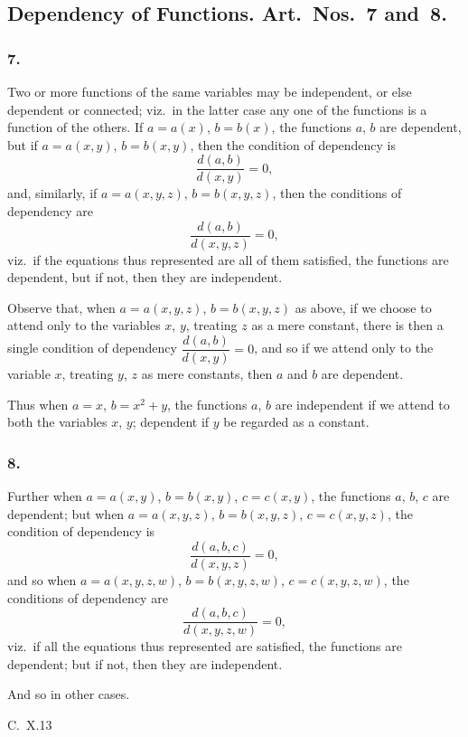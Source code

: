\documentclass[12pt,a4paper]{article}
\theoremstyle{plain}
\begin{document}
\subsection*{Dependency of Functions. Art.~Nos.~7 and~8.}

\subsubsection*{7.}

Two or more functions of the same variables may be independent, or else dependent or connected; viz.~in the latter case any one of the functions is a function of the others. If $a = a(x)$, $b = b(x)$, the functions $a$, $b$ are dependent, but if $a = a(x, y)$, $b = b(x, y)$, then the condition of dependency is
\[
\frac{d(a, b)}{d(x, y)} = 0,
\]
and, similarly, if $a = a(x, y, z)$, $b = b(x, y, z)$, then the conditions of dependency are
\[
\frac{d(a, b)}{d(x, y, z)} = 0,
\]
viz.~if the equations thus represented are all of them satisfied, the functions are dependent, but if not, then they are independent.

Observe that, when $a = a(x, y, z)$, $b = b(x, y, z)$ as above, if we choose to attend only to the variables $x$, $y$, treating $z$ as a mere constant, there is then a single condition of dependency $\dfrac{d(a, b)}{d(x, y)} = 0$, and so if we attend only to the variable $x$, treating $y$, $z$ as mere constants, then $a$ and $b$ are dependent.

Thus when $a = x$, $b = x^{2} + y$, the functions $a$, $b$ are independent if we attend to both the variables $x$, $y$; dependent if $y$ be regarded as a constant.

\subsubsection*{8.}

Further when $a = a(x, y)$, $b = b(x, y)$, $c = c(x, y)$, the functions $a$, $b$, $c$ are dependent; but when $a = a(x, y, z)$, $b = b(x, y, z)$, $c = c(x, y, z)$, the condition of dependency is
\[
\frac{d(a, b, c)}{d(x, y, z)} = 0,
\]
and so when $a = a(x, y, z, w)$, $b = b(x, y, z, w)$, $c = c(x, y, z, w)$, the conditions of dependency are
\[
\frac{d(a, b, c)}{d(x, y, z, w)} = 0,
\]
viz.~if all the equations thus represented are satisfied, the functions are dependent; but if not, then they are independent.

And so in other cases.

\medskip\noindent\textsc{C.~X.}\hfill 13
\end{document}
